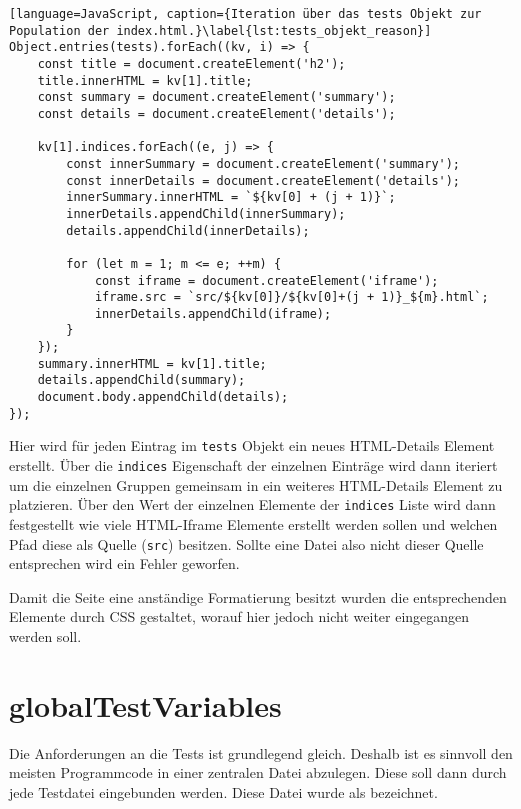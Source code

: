 \begin{lstlisting}[language=JavaScript, caption={Iteration über das tests Objekt zur Population der index.html.}\label{lst:tests_objekt_reason}]
Object.entries(tests).forEach((kv, i) => {
    const title = document.createElement('h2');
    title.innerHTML = kv[1].title;
    const summary = document.createElement('summary');
    const details = document.createElement('details');

    kv[1].indices.forEach((e, j) => {
        const innerSummary = document.createElement('summary');
        const innerDetails = document.createElement('details');
        innerSummary.innerHTML = `${kv[0] + (j + 1)}`;
        innerDetails.appendChild(innerSummary);
        details.appendChild(innerDetails);

        for (let m = 1; m <= e; ++m) {
            const iframe = document.createElement('iframe');
            iframe.src = `src/${kv[0]}/${kv[0]+(j + 1)}_${m}.html`;
            innerDetails.appendChild(iframe);
        }
    });
    summary.innerHTML = kv[1].title;
    details.appendChild(summary);
    document.body.appendChild(details);
});
\end{lstlisting}

Hier wird für jeden Eintrag im \lstinline{tests} Objekt ein neues HTML-Details Element erstellt. %
Über die \lstinline{indices} Eigenschaft der einzelnen Einträge wird dann iteriert um die einzelnen Gruppen gemeinsam in ein weiteres HTML-Details Element zu platzieren.
Über den Wert der einzelnen Elemente der \lstinline{indices} Liste wird dann festgestellt wie viele HTML-Iframe Elemente erstellt werden sollen und welchen Pfad diese als Quelle (\lstinline{src}) besitzen.
Sollte eine Datei also nicht dieser Quelle entsprechen wird ein Fehler geworfen.

Damit die Seite eine anständige Formatierung besitzt wurden die entsprechenden Elemente durch CSS gestaltet, worauf hier jedoch nicht weiter eingegangen werden soll.

\section{globalTestVariables}\label{ch:simulation_js}

Die Anforderungen an die Tests ist grundlegend gleich.
Deshalb ist es sinnvoll den meisten Programmcode in einer zentralen Datei abzulegen.
Diese soll dann durch jede Testdatei eingebunden werden.
Diese Datei wurde als  bezeichnet.

